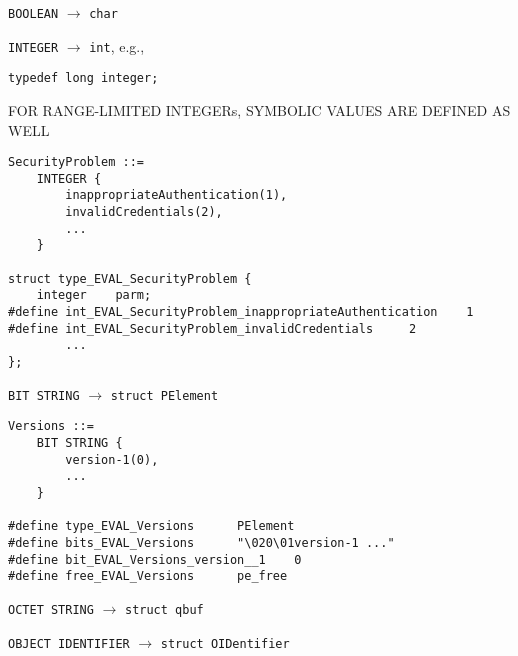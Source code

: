 \begin{bwslide}

\begin{nrtc}
\item	\verb"BOOLEAN" $\rightarrow$ \verb"char"

\item	\verb"INTEGER" $\rightarrow$ \verb"int", e.g.,
    \begin{nrtc}
    \item	\verb"typedef long integer;"
    \end{nrtc}
\end{nrtc}
\end{bwslide}


\begin{bwslide}

\begin{nrtc}
\item	FOR RANGE-LIMITED INTEGERs, SYMBOLIC VALUES ARE DEFINED AS WELL
\small\begin{verbatim}
SecurityProblem ::=
    INTEGER {
        inappropriateAuthentication(1),
        invalidCredentials(2),
        ...
    }

struct type_EVAL_SecurityProblem {
    integer    parm;
#define int_EVAL_SecurityProblem_inappropriateAuthentication    1
#define int_EVAL_SecurityProblem_invalidCredentials     2
        ...
};
\end{verbatim}
\end{nrtc}
\end{bwslide}


\begin{bwslide}

\begin{nrtc}
\item	\verb"BIT STRING" $\rightarrow$ \verb"struct PElement"
\begin{verbatim}
Versions ::=
    BIT STRING {
        version-1(0),
        ...
    }

#define type_EVAL_Versions      PElement
#define bits_EVAL_Versions      "\020\01version-1 ..."
#define bit_EVAL_Versions_version__1    0
#define free_EVAL_Versions      pe_free
\end{verbatim}

\item	\verb"OCTET STRING" $\rightarrow$ \verb"struct qbuf"

\item	\verb"OBJECT IDENTIFIER" $\rightarrow$ \verb"struct OIDentifier"
\end{nrtc}
\end{bwslide}


